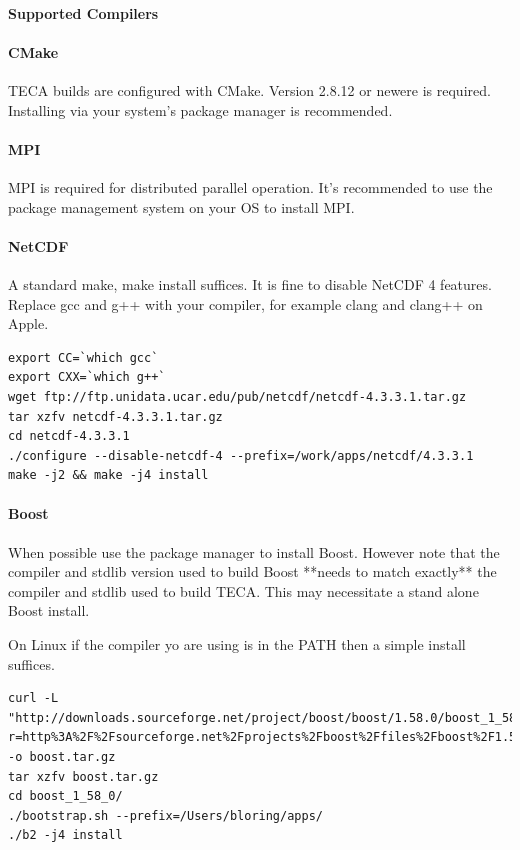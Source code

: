\documentclass[a4paper,10pt,DIV=12]{scrreprt}
\begin{document}
\paragraph{Supported Compilers}

\paragraph{CMake}
TECA builds are configured with CMake. Version 2.8.12 or newere is required.
Installing via your system's package manager is recommended.

\paragraph{MPI}
MPI is required for distributed parallel operation. It's recommended to use
the package management system on your OS to install MPI.

\paragraph{NetCDF}
A standard make, make install suffices. It is fine to disable NetCDF 4 features. Replace
gcc and g++ with your compiler, for example clang and clang++ on Apple.

\begin{verbatim}
export CC=`which gcc`
export CXX=`which g++`
wget ftp://ftp.unidata.ucar.edu/pub/netcdf/netcdf-4.3.3.1.tar.gz
tar xzfv netcdf-4.3.3.1.tar.gz
cd netcdf-4.3.3.1
./configure --disable-netcdf-4 --prefix=/work/apps/netcdf/4.3.3.1
make -j2 && make -j4 install
\end{verbatim}

\paragraph{Boost}
When possible use the package manager to install Boost. However note that the
compiler and stdlib version used to build Boost **needs to match exactly** the
compiler and stdlib used to build TECA. This may necessitate a stand alone
Boost install.

On Linux if the compiler yo are using is in the PATH then a simple install
suffices.

\begin{verbatim}
curl -L  "http://downloads.sourceforge.net/project/boost/boost/1.58.0/boost_1_58_0.tar.gz?r=http%3A%2F%2Fsourceforge.net%2Fprojects%2Fboost%2Ffiles%2Fboost%2F1.58.0%2F&ts=1434648565&use_mirror=tcpdiag" -o boost.tar.gz
tar xzfv boost.tar.gz
cd boost_1_58_0/
./bootstrap.sh --prefix=/Users/bloring/apps/
./b2 -j4 install
\end{verbatim}
\end{document}
